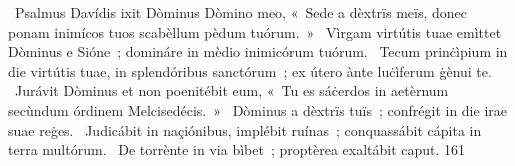 {~Psalmus Davídis}
{%
ixit Dòminus Dòmino meo, «~Sede a dèxtrïs meïs, donec ponam inimícos tuos scabèllum pèdum tuórum.~»
~Vìrgam virtútis tuae emìttet Dòminus e Sióne~; domináre in mèdio inimicórum tuórum.
~Tecum prinċìpium in die virtútis tuae, in splendóribus sanctórum~; ex útero ànte luċìferum ġènui te.
~Jurávit Dòminus et non poenitébit eum, «~Tu es sáċerdos in aetèrnum secùndum órdinem Melcisedécis.~»
~Dòminus a dèxtrïs tuïs~; confrégit in die irae suae reġes.
~Judicábit in naçiónibus, implébit ruínas~; conquassábit cápita in terra multórum.
~De torrènte in via bìbet~; proptèrea exaltábit caput.}
{16}{1}
